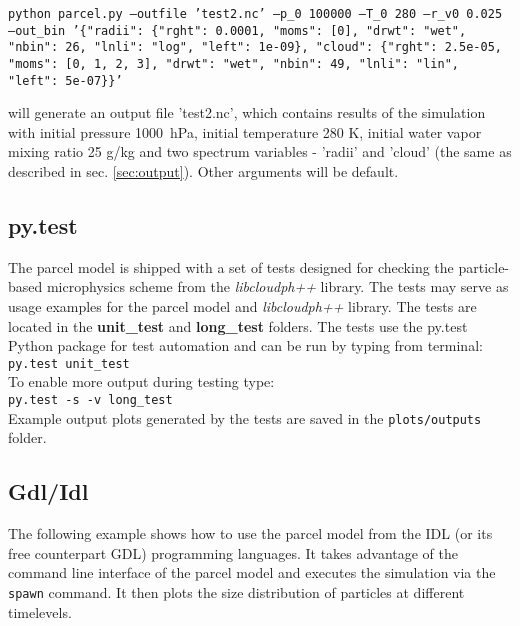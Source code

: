 \documentclass[11pt]{article}
\newcommand{\prog}[1]{{\tt#1}}
\begin{document}
\vspace{0.35cm}
 \prog{python parcel.py \texttt{--}outfile 'test2.nc' \texttt{--}p\_0 100000 \texttt{--}T\_0 280 \texttt{--}r\_v0 0.025 \texttt{--}out\_bin '\{"radii": \{"rght": 0.0001,  "moms": [0], "drwt": "wet", "nbin": 26, "lnli": "log", "left": 1e-09\}, "cloud": \{"rght": 2.5e-05, "moms": [0, 1, 2, 3], "drwt": "wet", "nbin": 49, "lnli": "lin", "left": 5e-07\}\}'}
\vspace{0.35cm}

\noindent
will generate an output file 'test2.nc', which contains results of the simulation with initial pressure 1000~hPa, initial temperature 280 K, initial water vapor mixing ratio 25 g/kg and two spectrum variables - 'radii' and 'cloud' (the same as described in sec. \ref{sec:output}). Other arguments will be default.

\subsection{py.test}

The parcel model is shipped with a set of tests designed for checking the particle-based microphysics scheme
  from the \emph{libcloudph++} library.
The tests may serve as usage examples for the parcel model and \emph{libcloudph++} library.
The tests are located in the {\bf unit\_test} and {\bf long\_test} folders.
The tests use the py.test Python package for test automation and can be run by typing from terminal:\\

\prog{py.test unit\_test}\\

\noindent
To enable more output during testing type:\\

\prog{py.test -s -v long\_test}\\

\noindent
Example output plots generated by the tests are saved in the \prog{plots/outputs} folder.

\newpage

\subsection{Gdl/Idl}

The following example shows how to use the parcel model from the IDL (or its free counterpart GDL)
   programming languages. 
It takes advantage of the command line interface of the parcel model
  and executes the simulation via the \prog{spawn} command.
It then plots the size distribution of particles at different timelevels.
\end{document}
